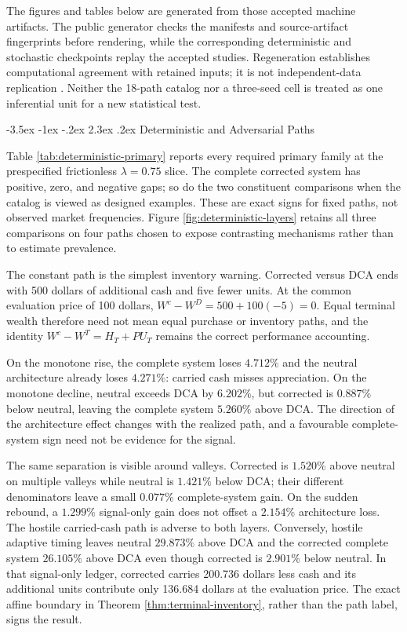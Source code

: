\documentclass[12pt,a4paper,oneside]{report}
\makeatletter
\renewcommand\section{\@startsection{section}{1}{\z@}%
  {-3.5ex \@plus -1ex \@minus -.2ex}%
  {2.3ex \@plus .2ex}%
  {\normalfont\fontsize{14}{17}\selectfont\bfseries}}
\makeatother
\begin{document}
The figures and tables below are generated from those accepted machine
artifacts. The public generator checks the manifests and source-artifact
fingerprints before rendering, while the corresponding deterministic and
stochastic checkpoints replay the accepted studies. Regeneration establishes
computational agreement with retained inputs; it is not independent-data
replication \citep{nasem2019reproducibility}. Neither the 18-path catalog nor a
three-seed cell is treated as one inferential unit for a new statistical test.

\section{Deterministic and Adversarial Paths}
\label{sec:deterministic}

Table \ref{tab:deterministic-primary} reports every required primary family at
the prespecified frictionless $\lambda=0.75$ slice. The complete corrected
system has positive, zero, and negative gaps; so do the two constituent
comparisons when the catalog is viewed as designed examples. These are exact
signs for fixed paths, not observed market frequencies. Figure
\ref{fig:deterministic-layers} retains all three comparisons on four paths
chosen to expose contrasting mechanisms rather than to estimate prevalence.

The constant path is the simplest inventory warning. Corrected versus DCA
ends with 500 dollars of additional cash and five fewer units. At the common
evaluation price of 100 dollars, $W^c-W^D=500+100(-5)=0$. Equal terminal
wealth therefore need not mean equal purchase or inventory paths, and the
identity $W^c-W^T=H_T+P U_T$ remains the correct performance accounting.


\FloatBarrier

On the monotone rise, the complete system loses $4.712\%$ and the neutral
architecture already loses $4.271\%$: carried cash misses appreciation. On the
monotone decline, neutral exceeds DCA by $6.202\%$, but corrected is
$0.887\%$ below neutral, leaving the complete system $5.260\%$ above DCA. The
direction of the architecture effect changes with the realized path, and a
favourable complete-system sign need not be evidence for the signal.

The same separation is visible around valleys. Corrected is $1.520\%$ above
neutral on multiple valleys while neutral is $1.421\%$ below DCA; their
different denominators leave a small $0.077\%$ complete-system gain. On the
sudden rebound, a $1.299\%$ signal-only gain does not offset a $2.154\%$
architecture loss. The hostile carried-cash path is adverse to both layers.
Conversely, hostile adaptive timing leaves neutral $29.873\%$ above DCA and
the corrected complete system $26.105\%$ above DCA even though corrected is
$2.901\%$ below neutral. In that signal-only ledger, corrected carries
200.736 dollars less cash and its additional units contribute only 136.684
dollars at the evaluation price. The exact affine boundary in Theorem
\ref{thm:terminal-inventory}, rather than the path label, signs the result.
\end{document}
